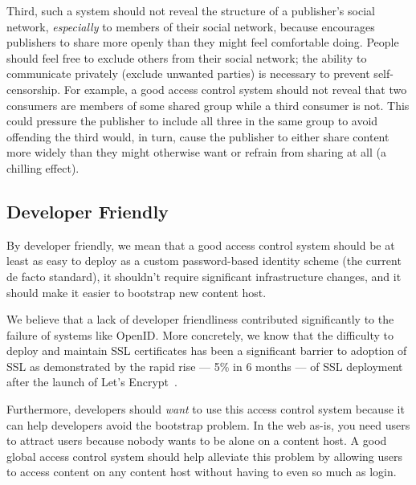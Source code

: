 \documentclass[pdftex,12pt,a4papaer]{report}
\begin{document}
Third, such a system should not reveal the structure of a publisher's social
network, \emph{especially} to members of their social network, because
encourages publishers to share more openly than they might feel comfortable
doing. People should feel free to exclude
others from their social network; the ability to communicate privately (exclude
unwanted parties) is necessary to prevent self-censorship. For example, a good
access control system should not reveal that two consumers are members of some
shared group while a third consumer is not. This could pressure the publisher to
include all three in the same group to avoid offending the third would, in turn,
cause the publisher to either share content more widely than they might
otherwise want or refrain from sharing at all (a chilling effect).



\subsection{Developer Friendly}
\label{sub:goal-developer}

By developer friendly, we mean that a good access control system should be at
least as easy to deploy as a custom password-based identity scheme (the current
de facto standard), it shouldn't require significant infrastructure changes, and
it should make it easier to bootstrap new content host.

We believe that a lack of developer friendliness contributed significantly to
the failure of systems like OpenID\cite{openid}. More concretely, we know that
the difficulty to deploy and maintain SSL certificates has been a significant
barrier to adoption of SSL as demonstrated by the rapid rise --- 5\% in 6 months
--- of SSL deployment after the launch of Let's Encrypt~\cite{lets-encrypt}.

Furthermore, developers should \emph{want} to use this access control system
because it can help developers avoid the bootstrap problem. In the web as-is,
you need users to attract users because nobody wants to be alone on a content
host. A good global access control system should help alleviate this problem by
allowing users to access content on any content host without having to even so
much as login.
\end{document}
